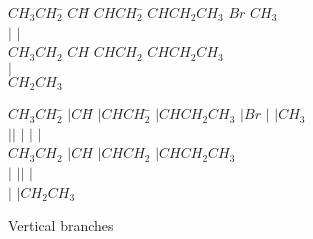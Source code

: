  \begin{figure}
  \hspace{1cm}
  \begin{minipage}{180pt}
  \begin{tabbing}
   $CH_{3}CH_{2}$\= $CH$\= $CHCH_{2}$\= $CHCH_{2}CH_{3}$\+ \kill
                    $Br$\>           \> $CH_{3}$       \\
    \hspace{2pt}$\vert $\>           \> \hspace{2pt}$\vert $ \- \\
   $CH_{3}CH_{2}$\> $CH$\> $CHCH_{2}$\> $CHCH_{2}CH_{3}$\+ \+ \\
     \hspace{2pt}   $\vert $                                  \\
                    $CH_{2}CH_{3}$
  \end{tabbing}
  \end{minipage}
  \hspace{2.5cm}
 \begin{minipage}{180pt}
  \begin{tabbing}
   $CH_{3}CH_{2}$\= $\vert CH$\= $\vert CHCH_{2}$\= $\vert CHCH_{2}CH_{3}$
                                                     \+ \kill
                    $\vert Br$\> $\vert $        \> $\vert CH_{3}$
                                                    \\
   $\vert $\hspace{2pt}$\vert $\> $\vert $       \> $\vert $\hspace{2pt}
                                                    $\vert $ \- \\
   $CH_{3}CH_{2}$\> $\vert CH$ \> $\vert CHCH_{2}$\> $\vert CHCH_{2}CH_{3}$
                                                    \+ \\
         $\vert $\> $\vert $\hspace{2pt}$\vert $  \> $\vert $
                                                    \\
         $\vert $\> $\vert CH_{2}CH_{3}$
   \end{tabbing}
   \end{minipage}
   \caption{Vertical branches}\label{fg:vertbranch}
  \end{figure}
 
